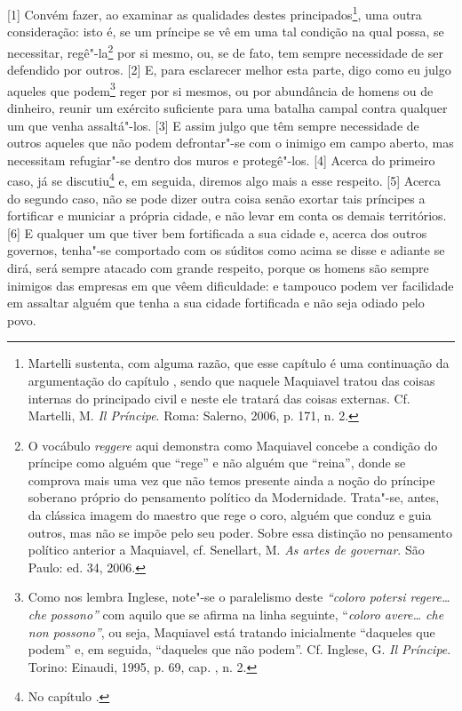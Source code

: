 {[}1{]} Convém fazer, ao examinar as qualidades destes
principados\footnote{Martelli sustenta, com alguma razão, que esse
  capítulo é uma continuação da argumentação do capítulo , sendo que
  naquele Maquiavel tratou das coisas internas do principado civil e
  neste ele tratará das coisas externas. Cf. Martelli, M. \emph{Il
  Príncipe}. Roma: Salerno, 2006, p. 171, n. 2.}, uma outra
consideração: isto é, se um príncipe se vê em uma tal condição na qual
possa, se necessitar, regê"-la\footnote{O vocábulo \emph{reggere} aqui
  demonstra como Maquiavel concebe a condição do príncipe como alguém
  que ``rege'' e não alguém que ``reina'', donde se comprova mais uma
  vez que não temos presente ainda a noção do príncipe soberano próprio
  do pensamento político da Modernidade. Trata"-se, antes, da clássica
  imagem do maestro que rege o coro, alguém que conduz e guia outros,
  mas não se impõe pelo seu poder. Sobre essa distinção no pensamento
  político anterior a Maquiavel, cf. Senellart, M. \emph{As artes de
  governar}. São Paulo: ed. 34, 2006.} por si mesmo, ou, se de fato, tem
sempre necessidade de ser defendido por outros. {[}2{]} E, para
esclarecer melhor esta parte, digo como eu julgo aqueles que
podem\footnote{Como nos lembra Inglese, note"-se o paralelismo deste
  \emph{``coloro potersi regere\ldots{} che possono''} com aquilo que se
  afirma na linha seguinte, ``\emph{coloro avere\ldots{} che non possono''},
  ou seja, Maquiavel está tratando inicialmente ``daqueles que podem''
  e, em seguida, ``daqueles que não podem''. Cf. Inglese, G. \emph{Il
  Príncipe}. Torino: Einaudi, 1995, p. 69, cap. , n. 2.} reger por si
mesmos, ou por abundância de homens ou de dinheiro, reunir um exército
suficiente para uma batalha campal contra qualquer um que venha
assaltá"-los. {[}3{]} E assim julgo que têm sempre necessidade de outros
aqueles que não podem defrontar"-se com o inimigo em campo aberto, mas
necessitam refugiar"-se dentro dos muros e protegê"-los. {[}4{]} Acerca do
primeiro caso, já se discutiu\footnote{No capítulo .} e, em seguida,
diremos algo mais a esse respeito. {[}5{]} Acerca do segundo caso, não
se pode dizer outra coisa senão exortar tais príncipes a fortificar e
municiar a própria cidade, e não levar em conta os demais territórios.
{[}6{]} E qualquer um que tiver bem fortificada a sua cidade e, acerca
dos outros governos, tenha"-se comportado com os súditos como acima se
disse e adiante se dirá, será sempre atacado com grande respeito, porque
os homens são sempre inimigos das empresas em que vêem dificuldade: e
tampouco podem ver facilidade em assaltar alguém que tenha a sua cidade
fortificada e não seja odiado pelo povo.

